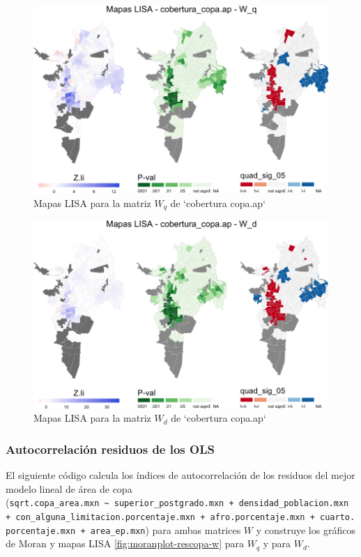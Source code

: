 \documentclass[12pt,]{book}
\begin{document}
\begin{figure}
\includegraphics[width=1\linewidth]{tesis-unigis_files/figure-latex/mapas-lisa-copaap-wq-1} \caption{Mapas LISA para la matriz $W_q$ de `cobertura copa.ap`}\label{fig:mapas-lisa-copaap-wq}
\end{figure}

\begin{figure}
\includegraphics[width=1\linewidth]{tesis-unigis_files/figure-latex/mapas-lisa-copaap-wd-1} \caption{Mapas LISA para la matriz $W_d$ de `cobertura copa.ap`}\label{fig:mapas-lisa-copaap-wd}
\end{figure}

\subsubsection{Autocorrelación residuos de los
OLS}\label{autocorrelacion-residuos-de-los-ols}

El siguiente código calcula los índices de autocorrelación de los
residuos del mejor modelo lineal de área de copa
(\texttt{sqrt.copa\_area.mxn\ \textasciitilde{}\ superior\_postgrado.mxn\ +\ densidad\_poblacion.mxn\ +\ con\_alguna\_limitacion.porcentaje.mxn\ +\ afro.porcentaje.mxn\ +\ cuarto.porcentaje.mxn\ +\ area\_ep.mxn})
para ambas matrices \(W\) y construye los gráficos de Moran y mapas LISA
\ref{fig:moranplot-rescopa-w} para \(W_q\) y para \(W_d\).
\end{document}
